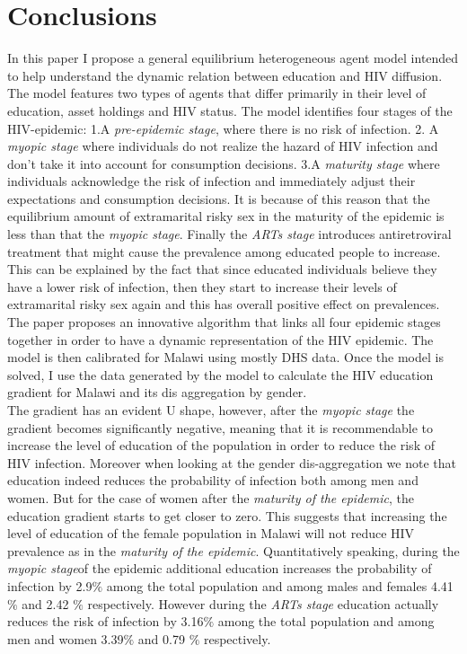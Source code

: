 \section{Conclusions}\label{sec7}
In this paper I propose a general equilibrium heterogeneous agent model intended to help understand the dynamic relation between education and HIV diffusion. The model features two types of agents that differ primarily in their level of education, asset holdings and HIV status. The model identifies four stages of the HIV-epidemic: 1.A \textit{pre-epidemic stage}, where there is no risk of infection. 2. A \textit{myopic stage} where individuals do not realize the hazard of HIV infection and don't take it into account for consumption decisions. 3.A \textit{maturity stage} where individuals acknowledge the risk of infection and immediately adjust their expectations and consumption decisions. It is because of this reason that the equilibrium amount of extramarital risky sex in the maturity of the epidemic is less than that the \textit{myopic stage}. Finally the \textit{ARTs stage} introduces antiretroviral treatment that might cause the prevalence among educated people to increase. This can be explained by the fact that since educated individuals believe they have a lower risk of infection, then they start to increase their levels of extramarital risky sex again and this has overall positive effect on prevalences. \\

 The paper proposes an innovative algorithm that links all four epidemic stages together in order to have a dynamic representation of the HIV epidemic. The model is then calibrated for Malawi using mostly DHS data. Once the model is solved, I use the data generated by the model to calculate the HIV education gradient for Malawi and its dis aggregation by gender.\\
 
 The gradient has an evident U shape, however, after the \textit{myopic stage} the gradient becomes significantly negative, meaning that it is recommendable to increase the level of education of the population in order to reduce the risk of HIV infection. Moreover when looking at the gender dis-aggregation we note that education indeed reduces the probability of infection both  among men and women. But for the case of women after the \textit{maturity of the epidemic}, the education gradient starts to get closer to zero. This suggests that increasing the level of education of the female population in Malawi will not reduce HIV prevalence as in the \textit{maturity of the epidemic}. Quantitatively speaking, during the \textit{myopic stage}of the epidemic additional education increases the probability of infection by 2.9${\%}$ among the total population and among males and females 4.41${\%}$ and 2.42 ${\%}$ respectively. However during the \textit{ARTs stage} education actually reduces the risk of infection by  3.16${\%}$ among the total population and among men and women 3.39${\%}$ and 0.79 ${\%}$ respectively. 